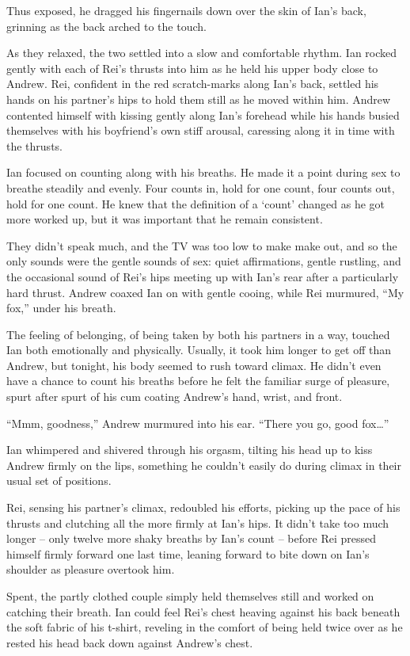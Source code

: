 Thus exposed, he dragged his fingernails down over the skin of Ian's back, grinning as the back arched to the touch.

As they relaxed, the two settled into a slow and comfortable rhythm. Ian rocked gently with each of Rei's thrusts into him as he held his upper body close to Andrew. Rei, confident in the red scratch-marks along Ian's back, settled his hands on his partner's hips to hold them still as he moved within him. Andrew contented himself with kissing gently along Ian's forehead while his hands busied themselves with his boyfriend's own stiff arousal, caressing along it in time with the thrusts.

Ian focused on counting along with his breaths. He made it a point during sex to breathe steadily and evenly. Four counts in, hold for one count, four counts out, hold for one count. He knew that the definition of a `count' changed as he got more worked up, but it was important that he remain consistent.

They didn't speak much, and the TV was too low to make make out, and so the only sounds were the gentle sounds of sex: quiet affirmations, gentle rustling, and the occasional sound of Rei's hips meeting up with Ian's rear after a particularly hard thrust. Andrew coaxed Ian on with gentle cooing, while Rei murmured, ``My fox,'' under his breath.

The feeling of belonging, of being taken by both his partners in a way, touched Ian both emotionally and physically. Usually, it took him longer to get off than Andrew, but tonight, his body seemed to rush toward climax. He didn't even have a chance to count his breaths before he felt the familiar surge of pleasure, spurt after spurt of his cum coating Andrew's hand, wrist, and front.

``Mmm, goodness,'' Andrew murmured into his ear. ``There you go, good fox\ldots{}''

Ian whimpered and shivered through his orgasm, tilting his head up to kiss Andrew firmly on the lips, something he couldn't easily do during climax in their usual set of positions.

Rei, sensing his partner's climax, redoubled his efforts, picking up the pace of his thrusts and clutching all the more firmly at Ian's hips. It didn't take too much longer -- only twelve more shaky breaths by Ian's count -- before Rei pressed himself firmly forward one last time, leaning forward to bite down on Ian's shoulder as pleasure overtook him.

Spent, the partly clothed couple simply held themselves still and worked on catching their breath. Ian could feel Rei's chest heaving against his back beneath the soft fabric of his t-shirt, reveling in the comfort of being held twice over as he rested his head back down against Andrew's chest.

